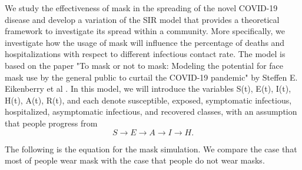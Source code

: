 \documentclass{article}
\begin{document}
We study the effectiveness of mask in the spreading of the novel COVID-19 disease and develop a variation of the SIR model that provides a theoretical framework to investigate its spread within a community. More specifically, we investigate how the usage of mask will influence the percentage of deaths and hospitalizations with respect to different infectious contact rate. The model is based on the paper "To mask or not to mask: Modeling the potential for face mask use by the general public to curtail the COVID-19 pandemic" by Steffen E. Eikenberry et al \cite{Steff2020mask}. In this model, we will introduce the variables S(t), E(t), I(t), H(t), A(t), R(t), and each denote susceptible, exposed, symptomatic infectious, hospitalized, asymptomatic infectious, and recovered classes, with an assumption that people progress from 
$$S \rightarrow E \rightarrow A \rightarrow I \rightarrow H. $$ 

\noindent
The following is the equation for the mask simulation. We compare the case that most of  people wear mask with the case that people do not wear masks.
\end{document}

